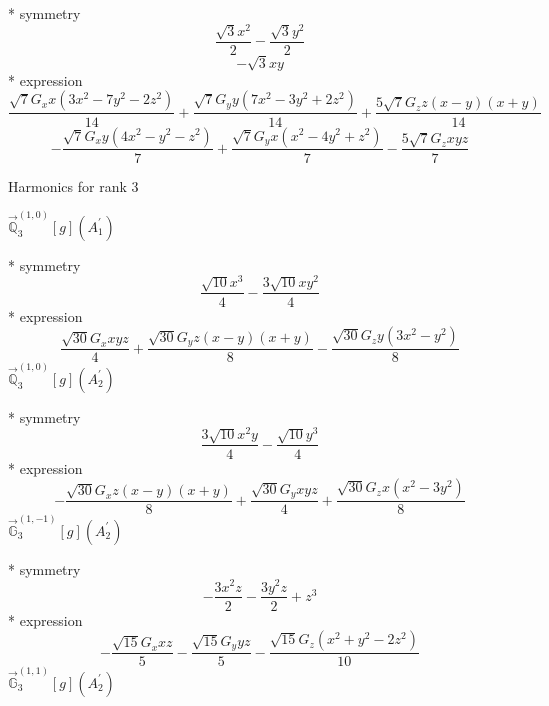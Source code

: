 \documentclass[fleqn,8pt]{jsarticle}
\begin{document}
\noindent\quad ** symmetry
\begin{dmath*}
\frac{\sqrt{3} x^{2}}{2} - \frac{\sqrt{3} y^{2}}{2}
\end{dmath*}
\begin{dmath*}
- \sqrt{3} x y
\end{dmath*}
\noindent\quad ** expression
\begin{dmath*}
\frac{\sqrt{7} G_{x} x \left(3 x^{2} - 7 y^{2} - 2 z^{2}\right)}{14} + \frac{\sqrt{7} G_{y} y \left(7 x^{2} - 3 y^{2} + 2 z^{2}\right)}{14} + \frac{5 \sqrt{7} G_{z} z \left(x - y\right) \left(x + y\right)}{14}
\end{dmath*}
\begin{dmath*}
- \frac{\sqrt{7} G_{x} y \left(4 x^{2} - y^{2} - z^{2}\right)}{7} + \frac{\sqrt{7} G_{y} x \left(x^{2} - 4 y^{2} + z^{2}\right)}{7} - \frac{5 \sqrt{7} G_{z} x y z}{7}
\end{dmath*}

\noindent * Harmonics for rank 3

\noindent\quad $\vec{\mathbb{Q}}_{3}^{(1,0)}[g](A_{1}^{\prime})$

\noindent\quad ** symmetry
\begin{dmath*}
\frac{\sqrt{10} x^{3}}{4} - \frac{3 \sqrt{10} x y^{2}}{4}
\end{dmath*}
\noindent\quad ** expression
\begin{dmath*}
\frac{\sqrt{30} G_{x} x y z}{4} + \frac{\sqrt{30} G_{y} z \left(x - y\right) \left(x + y\right)}{8} - \frac{\sqrt{30} G_{z} y \left(3 x^{2} - y^{2}\right)}{8}
\end{dmath*}
\noindent\quad $\vec{\mathbb{Q}}_{3}^{(1,0)}[g](A_{2}^{\prime})$

\noindent\quad ** symmetry
\begin{dmath*}
\frac{3 \sqrt{10} x^{2} y}{4} - \frac{\sqrt{10} y^{3}}{4}
\end{dmath*}
\noindent\quad ** expression
\begin{dmath*}
- \frac{\sqrt{30} G_{x} z \left(x - y\right) \left(x + y\right)}{8} + \frac{\sqrt{30} G_{y} x y z}{4} + \frac{\sqrt{30} G_{z} x \left(x^{2} - 3 y^{2}\right)}{8}
\end{dmath*}
\noindent\quad $\vec{\mathbb{G}}_{3}^{(1,-1)}[g](A_{2}^{\prime})$

\noindent\quad ** symmetry
\begin{dmath*}
- \frac{3 x^{2} z}{2} - \frac{3 y^{2} z}{2} + z^{3}
\end{dmath*}
\noindent\quad ** expression
\begin{dmath*}
- \frac{\sqrt{15} G_{x} x z}{5} - \frac{\sqrt{15} G_{y} y z}{5} - \frac{\sqrt{15} G_{z} \left(x^{2} + y^{2} - 2 z^{2}\right)}{10}
\end{dmath*}
\noindent\quad $\vec{\mathbb{G}}_{3}^{(1,1)}[g](A_{2}^{\prime})$
\end{document}

